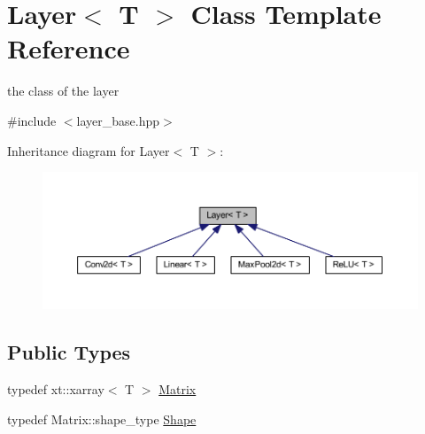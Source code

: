 \hypertarget{class_layer}{}\section{Layer$<$ T $>$ Class Template Reference}
\label{class_layer}


the class of the layer  




{\ttfamily \#include $<$layer\+\_\+base.\+hpp$>$}



Inheritance diagram for Layer$<$ T $>$\+:
\nopagebreak
\begin{figure}[H]
\begin{center}
\leavevmode
\includegraphics[width=350pt]{class_layer__inherit__graph}
\end{center}
\end{figure}
\subsection*{Public Types}
\begin{DoxyCompactItemize}
\item 
typedef xt\+::xarray$<$ T $>$ \mbox{\hyperlink{class_layer_a22b1e7286096aa62bd245536c8ebdaf1}{Matrix}}
\item 
typedef Matrix\+::shape\+\_\+type \mbox{\hyperlink{class_layer_a8313f42d2292d12dd5d40cc115636693}{Shape}}
\end{DoxyCompactItemize}
